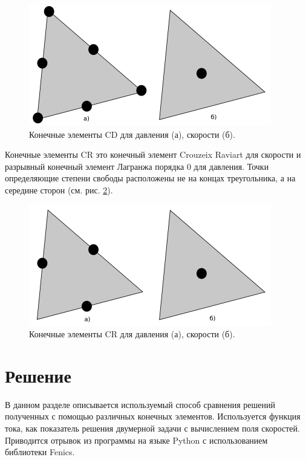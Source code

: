 \documentclass[12pt]{article}
\begin{document}
\begin{figure}
	\begin{center}
		\includegraphics[width=400px]{pics/CD}
		\caption{Конечные элементы CD для давления (а), скорости (б).}		\label{fg:cd}
	\end{center}
\end{figure}

Конечные элементы CR это конечный элемент Crouzeix Raviart для скорости и разрывный конечный элемент Лагранжа порядка 0 для давления. Точки определяющие степени свободы расположены не на концах треугольника, а на середине сторон (см. рис. \ref{fg:cr}).

\begin{figure}
	\begin{center}
		\includegraphics[width=400px]{pics/CR}
		\caption{Конечные элементы CR для давления (а), скорости (б).}		                        \label{fg:cr}
	\end{center}
\end{figure}

\section{Решение}
В данном разделе описывается используемый способ сравнения решений полученных с помощью различных конечных элементов. Используется функция тока, как показатель решения двумерной задачи с вычислением поля скоростей. Приводится отрывок из программы на языке Python с использованием библиотеки Fenics.
\end{document}

